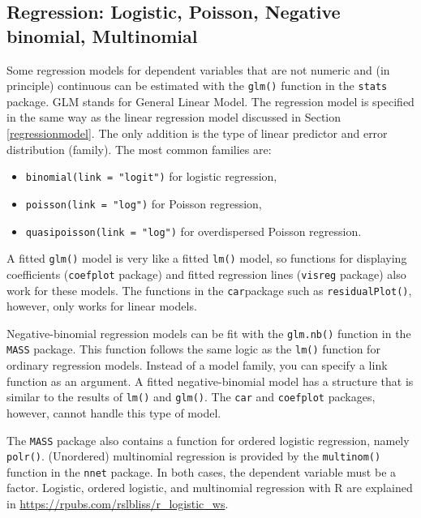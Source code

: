 \documentclass[doc,floatsintext]{apa6}
\providecommand{\tightlist}{%
  \setlength{\itemsep}{0pt}\setlength{\parskip}{0pt}}
\begin{document}
\subsection{Regression: Logistic, Poisson, Negative binomial,
Multinomial}\label{glm}

Some regression models for dependent variables that are not numeric and
(in principle) continuous can be estimated with the \texttt{glm()}
function in the \texttt{stats} package. GLM stands for General Linear
Model. The regression model is specified in the same way as the linear
regression model discussed in Section \ref{regressionmodel}. The only
addition is the type of linear predictor and error distribution
(family). The most common families are:

\begin{itemize}
\tightlist
\item
  \texttt{binomial(link\ =\ "logit")} for logistic regression,
\item
  \texttt{poisson(link\ =\ "log")} for Poisson regression,
\item
  \texttt{quasipoisson(link\ =\ "log")} for overdispersed Poisson
  regression.
\end{itemize}

A fitted \texttt{glm()} model is very like a fitted \texttt{lm()} model,
so functions for displaying coefficients (\texttt{coefplot} package) and
fitted regression lines (\texttt{visreg} package) also work for these
models. The functions in the \texttt{car}package such as
\texttt{residualPlot()}, however, only works for linear models.

Negative-binomial regression models can be fit with the
\texttt{glm.nb()} function in the \texttt{MASS} package. This function
follows the same logic as the \texttt{lm()} function for ordinary
regression models. Instead of a model family, you can specify a link
function as an argument. A fitted negative-binomial model has a
structure that is similar to the results of \texttt{lm()} and
\texttt{glm()}. The \texttt{car} and \texttt{coefplot} packages,
however, cannot handle this type of model.

The \texttt{MASS} package also contains a function for ordered logistic
regression, namely \texttt{polr()}. (Unordered) multinomial regression
is provided by the \texttt{multinom()} function in the \texttt{nnet}
package. In both cases, the dependent variable must be a factor.
Logistic, ordered logistic, and multinomial regression with R are
explained in \url{https://rpubs.com/rslbliss/r_logistic_ws}.
\end{document}
